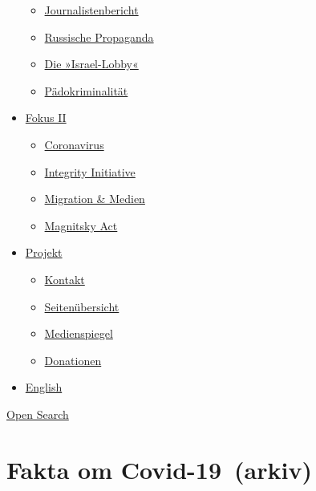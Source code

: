\begin{itemize}
  \begin{itemize}
  \tightlist
  \item
    \href{https://swprs.org/bericht-eines-journalisten/}{Journalistenbericht}
  \item
    \href{https://swprs.org/russische-propaganda/}{Russische Propaganda}
  \item
    \href{https://swprs.org/die-israel-lobby-fakten-und-mythen/}{Die
    »Israel-Lobby«}
  \item
    \href{https://swprs.org/geopolitik-und-paedokriminalitaet/}{Pädokriminalität}
  \end{itemize}
\item
  \href{https://swprs.org/migration-und-medien/}{Fokus II}

  \begin{itemize}
  \tightlist
  \item
    \href{https://swprs.org/covid-19-hinweis-ii/}{Coronavirus}
  \item
    \href{https://swprs.org/die-integrity-initiative/}{Integrity
    Initiative}
  \item
    \href{https://swprs.org/migration-und-medien/}{Migration \& Medien}
  \item
    \href{https://swprs.org/der-fall-magnitsky/}{Magnitsky Act}
  \end{itemize}
\item
  \href{https://swprs.org/kontakt/}{Projekt}

  \begin{itemize}
  \tightlist
  \item
    \href{https://swprs.org/kontakt/}{Kontakt}
  \item
    \href{https://swprs.org/uebersicht/}{Seitenübersicht}
  \item
    \href{https://swprs.org/medienspiegel/}{Medienspiegel}
  \item
    \href{https://swprs.org/donationen/}{Donationen}
  \end{itemize}
\item
  \href{https://swprs.org/contact/}{English}
\end{itemize}

\protect\hyperlink{}{Open Search}

\hypertarget{fakta-om-covid-19-arkiv}{%
\section{Fakta om Covid-19~(arkiv)}\label{fakta-om-covid-19-arkiv}}


